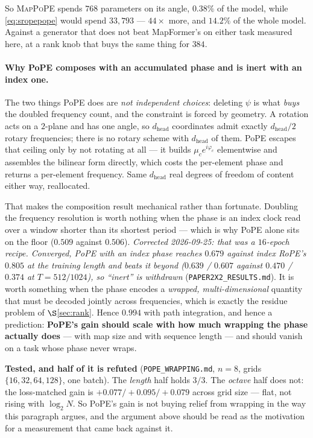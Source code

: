 \documentclass[11pt]{article}
\newcommand{\hd}{d_{\mathrm{head}}}
\begin{document}
\noindent So \textsc{MapPoPE} spends $768$ parameters on its angle, $0.38\%$ of the
model, while \eqref{eq:sropepope} would spend $33{,}793$ --- $44\times$ more, and
$14.2\%$ of the whole model. Against a generator that does not beat MapFormer's on
either task measured here, at a rank knob that buys the same thing for $384$.

\paragraph{Why PoPE composes with an accumulated phase and is inert with an index
one.} The two things PoPE does are \emph{not independent choices}: deleting
$\psi$ is what \emph{buys} the doubled frequency count, and the constraint is
forced by geometry. A rotation acts on a $2$-plane and has one angle, so $\hd$
coordinates admit exactly $\hd/2$ rotary frequencies; there is no rotary scheme
with $\hd$ of them. PoPE escapes that ceiling only by not rotating at all --- it
builds $\mu_c e^{i\varphi_c}$ elementwise and assembles the bilinear form
directly, which costs the per-element phase and returns a per-element frequency.
Same $\hd$ real degrees of freedom of content either way, reallocated.

That makes the composition result mechanical rather than fortunate. Doubling the
frequency resolution is worth nothing when the phase is an index clock read over a
window shorter than its shortest period --- which is why PoPE alone sits on the
floor ($0.509$ against $0.506$). \emph{Corrected 2026-09-25: that was a $16$-epoch
recipe. Converged, PoPE with an index phase reaches $0.679$ against index RoPE's
$0.805$ at the training length and beats it beyond ($0.639$ / $0.607$ against $0.470$
/ $0.374$ at $T=512/1024$), so ``inert'' is withdrawn} (\texttt{PAPER2X2\_RESULTS.md}). It is worth something when the phase encodes a
\emph{wrapped, multi-dimensional} quantity that must be decoded jointly across
frequencies, which is exactly the residue problem of $\S$\ref{sec:rank}. Hence
$0.994$ with path integration, and hence a prediction: \textbf{PoPE's gain should
scale with how much wrapping the phase actually does} --- with map size and with
sequence length --- and should vanish on a task whose phase never wraps.

\textbf{Tested, and half of it is refuted} (\texttt{POPE\_WRAPPING.md}, $n=8$,
grids $\{16,32,64,128\}$, one batch). The \emph{length} half holds $3/3$. The
\emph{octave} half does not: the loss-matched gain is $+0.077 / +0.095 / +0.079$
across grid size --- flat, not rising with $\log_2 N$. So PoPE's gain is not
buying relief from wrapping in the way this paragraph argues, and the argument
above should be read as the motivation for a measurement that came back against
it.
\end{document}
